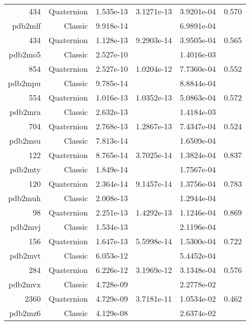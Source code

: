 \begin{xltabular}{\textwidth}{r|rS[table-format=1.3e+2]S[table-format=1.4e+2]S[table-format=1.4e+2]S[table-format=-1.3]}
434 & Quaternion & 1.535e-13 & 3.1271e-13 & 3.9201e-04 & 0.570\\  \addlinespace
{\color{red} pdb2mlf } & Classic & 9.918e-14 &  & 6.9891e-04 & \\
434 & Quaternion & 1.128e-13 & 9.2903e-14 & 3.9505e-04 & 0.565\\  \addlinespace
{\color{red} pdb2mo5 } & Classic & 2.527e-10 &  & 1.4016e-03 & \\
854 & Quaternion & 2.527e-10 & 1.0204e-12 & 7.7360e-04 & 0.552\\  \addlinespace
{\color{red} pdb2mpu } & Classic & 9.785e-14 &  & 8.8844e-04 & \\
554 & Quaternion & 1.016e-13 & 1.0352e-13 & 5.0863e-04 & 0.572\\  \addlinespace
{\color{red} pdb2mra } & Classic & 2.632e-13 &  & 1.4184e-03 & \\
704 & Quaternion & 2.768e-13 & 1.2867e-13 & 7.4347e-04 & 0.524\\  \addlinespace
{\color{red} pdb2msu } & Classic & 7.813e-14 &  & 1.6509e-04 & \\
122 & Quaternion & 8.765e-14 & 3.7025e-14 & 1.3824e-04 & 0.837\\  \addlinespace
{\color{red} pdb2mty } & Classic & 1.849e-14 &  & 1.7567e-04 & \\
120 & Quaternion & 2.364e-14 & 9.1457e-14 & 1.3756e-04 & 0.783\\  \addlinespace
{\color{red} pdb2muh } & Classic & 2.008e-13 &  & 1.2944e-04 & \\
98 & Quaternion & 2.251e-13 & 1.4292e-13 & 1.1246e-04 & 0.869\\  \addlinespace
{\color{red} pdb2mvj } & Classic & 1.534e-13 &  & 2.1196e-04 & \\
156 & Quaternion & 1.647e-13 & 5.5998e-14 & 1.5300e-04 & 0.722\\  \addlinespace
{\color{red} pdb2mvt } & Classic & 6.053e-12 &  & 5.4452e-04 & \\
284 & Quaternion & 6.226e-12 & 3.1969e-12 & 3.1348e-04 & 0.576\\  \addlinespace
{\color{red} pdb2mvx } & Classic & 4.728e-09 &  & 2.2778e-02 & \\
2360 & Quaternion & 4.729e-09 & 3.7181e-11 & 1.0534e-02 & 0.462\\  \addlinespace
{\color{red} pdb2mz6 } & Classic & 4.129e-08 &  & 2.6374e-02 & \\

\end{xltabular}
